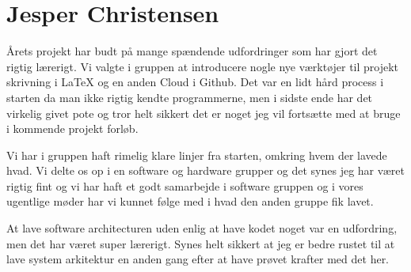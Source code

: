 \section{Jesper Christensen}

Årets projekt har budt på mange spændende udfordringer som har gjort det rigtig lærerigt. Vi valgte i gruppen at introducere nogle nye værktøjer til projekt skrivning i LaTeX og en anden Cloud i Github. Det var en lidt hård process i starten da man ikke rigtig kendte programmerne, men i sidste ende har det virkelig givet pote og tror helt sikkert det er noget jeg vil fortsætte med at bruge i kommende projekt forløb.

Vi har i gruppen haft rimelig klare linjer fra starten, omkring hvem der lavede hvad. Vi delte os op i en software og hardware grupper og det synes jeg har været rigtig fint og vi har haft et godt samarbejde i software gruppen og i vores ugentlige møder har vi kunnet følge med i hvad den anden gruppe fik lavet.

At lave software architecturen uden enlig at have kodet noget var en udfordring, men det har været super lærerigt. Synes helt sikkert at jeg er bedre rustet til at lave system arkitektur en anden gang efter at have prøvet krafter med det her.